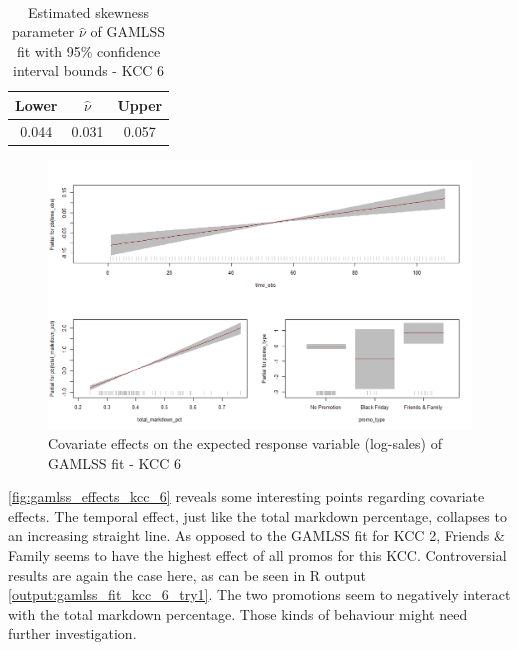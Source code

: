 \begin{table}[H]
\setlength\arrayrulewidth{1pt}  
\centering
\begin{adjustbox}{max width=\textwidth}\
\begin{tabular}{|c|c|c|}
\hline
\rowcolor{lightgray} 
Lower & $\hat{\nu}$ & Upper \\ \hline
0.044        & 0.031           & 0.057        \\ \hline
\end{tabular}
\end{adjustbox}
\caption{Estimated skewness parameter $\hat{\nu}$ of GAMLSS fit with 95\% confidence interval bounds - KCC 6}
\label{tab:nu_ci_kcc_6}
\end{table}







\begin{figure}[H]
\centering
  \includegraphics[width=0.95\linewidth]{figures/gamlss_effects_kcc_6.png}
  \caption{Covariate effects on the expected response variable (log-sales) of GAMLSS fit - KCC 6}
  \label{fig:gamlss_effects_kcc_6}
\end{figure}



\autoref{fig:gamlss_effects_kcc_6} reveals some interesting points regarding covariate effects. The temporal effect, just like the total markdown percentage, collapses to an increasing straight line. 
As opposed to the \ac{GAMLSS} fit for \ac{KCC} 2, Friends \& Family seems to have the highest effect of all promos for this \ac{KCC}. Controversial results are again the case here, as can be seen in R output \ref{output:gamlss_fit_kcc_6_try1}. The two promotions seem to negatively interact with the total markdown percentage. Those kinds of behaviour might need further investigation.
\\


